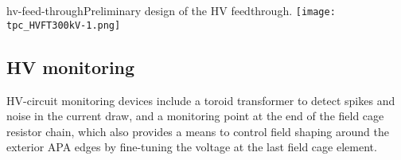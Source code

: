 \begin{cdrfigure}[HV feedthrough]{hv-feed-through}{Preliminary design of the HV feedthrough.}
\texttt{[image: tpc\_HVFT300kV-1.png]}
\end{cdrfigure}





\subsection{HV monitoring}

HV-circuit monitoring devices include a toroid transformer to detect
spikes and noise in the current draw, and a monitoring point at the
end of the field cage resistor chain, which also provides a means to
control field shaping around the exterior APA edges by fine-tuning the
voltage at the last field cage element.

